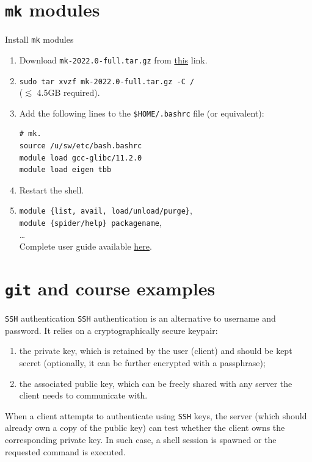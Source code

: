 \documentclass{beamer}
\begin{document}
\section{\texttt{mk} modules}
\begin{frame}[fragile]{Install \texttt{mk} modules}
\begin{enumerate}
    \item Download \texttt{mk-2022.0-full.tar.gz} from \href{https://github.com/elauksap/mk/releases/download/v2022.0/mk-2022.0-full.tar.gz}{this} link.
    \item \texttt{sudo tar xvzf mk-2022.0-full.tar.gz -C /} \\
    ($\lesssim$ 4.5GB required).
    \item Add the following lines to the \texttt{\${HOME}/.bashrc} file (or equivalent):
    \begin{lstlisting}
# mk.
source /u/sw/etc/bash.bashrc
module load gcc-glibc/11.2.0
module load eigen tbb
    \end{lstlisting}
    \item Restart the shell.
    \item \texttt{module \{list, avail, load/unload/purge\}},\\ \texttt{module \{spider/help\} packagename}, \\
    \dots\\
    Complete user guide available \href{https://lmod.readthedocs.io/en/latest/010_user.html}{here}.
\end{enumerate}
\end{frame}

\section{\texttt{git} and course examples}
\begin{frame}{\texttt{SSH} authentication}
\texttt{SSH} authentication is an alternative to username and password.
\vfill
It relies on a cryptographically secure keypair:

\begin{enumerate}
    \item the private key, which is retained by the user (client) and should be kept secret (optionally, it can be further encrypted with a passphrase);
    \item the associated public key, which can be freely shared with any server the client needs to communicate with.
\end{enumerate}
\vfill
When a client attempts to authenticate using \texttt{SSH} keys, the server (which should already own a copy of the public key) can test whether the client owns the corresponding private key. In such case, a shell session is spawned or the requested command is executed.
\end{frame}
\end{document}
